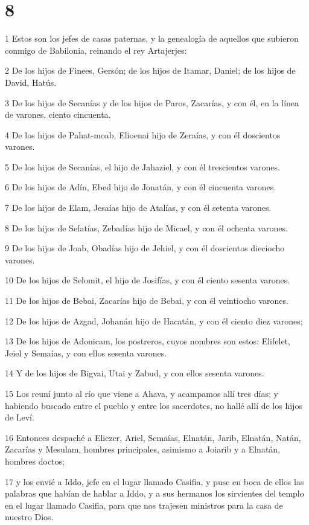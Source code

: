\chapter{8}

\par 1 Estos son los jefes de casas paternas, y la genealogía de aquellos que subieron conmigo de Babilonia, reinando el rey Artajerjes:
\par 2 De los hijos de Finees, Gersón; de los hijos de Itamar, Daniel; de los hijos de David, Hatús.
\par 3 De los hijos de Secanías y de los hijos de Paros, Zacarías, y con él, en la línea de varones, ciento cincuenta.
\par 4 De los hijos de Pahat-moab, Elioenai hijo de Zeraías, y con él doscientos varones.
\par 5 De los hijos de Secanías, el hijo de Jahaziel, y con él trescientos varones.
\par 6 De los hijos de Adín, Ebed hijo de Jonatán, y con él cincuenta varones.
\par 7 De los hijos de Elam, Jesaías hijo de Atalías, y con él setenta varones.
\par 8 De los hijos de Sefatías, Zebadías hijo de Micael, y con él ochenta varones.
\par 9 De los hijos de Joab, Obadías hijo de Jehiel, y con él doscientos dieciocho varones.
\par 10 De los hijos de Selomit, el hijo de Josifías, y con él ciento sesenta varones.
\par 11 De los hijos de Bebai, Zacarías hijo de Bebai, y con él veintiocho varones.
\par 12 De los hijos de Azgad, Johanán hijo de Hacatán, y con él ciento diez varones;
\par 13 De los hijos de Adonicam, los postreros, cuyos nombres son estos: Elifelet, Jeiel y Semaías, y con ellos sesenta varones.
\par 14 Y de los hijos de Bigvai, Utai y Zabud, y con ellos sesenta varones.
\par 15 Los reuní junto al río que viene a Ahava, y acampamos allí tres días; y habiendo buscado entre el pueblo y entre los sacerdotes, no hallé allí de los hijos de Leví.
\par 16 Entonces despaché a Eliezer, Ariel, Semaías, Elnatán, Jarib, Elnatán, Natán, Zacarías y Mesulam, hombres principales, asimismo a Joiarib y a Elnatán, hombres doctos;
\par 17 y los envié a Iddo, jefe en el lugar llamado Casifia, y puse en boca de ellos las palabras que habían de hablar a Iddo, y a sus hermanos los sirvientes del templo en el lugar llamado Casifia, para que nos trajesen ministros para la casa de nuestro Dios.
